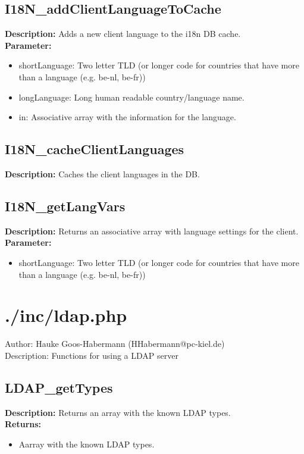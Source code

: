 \subsection{I18N\_addClientLanguageToCache}
\textbf{Description:} Adds a new client language to the i18n DB cache.\\
\textbf{Parameter:}
\begin{itemize}
\item shortLanguage: Two letter TLD (or longer code for countries that have more than a language (e.g. be-nl, be-fr))
\item longLanguage: Long human readable country/language name.
\item in: Associative array with the information for the language.
\end{itemize}

\subsection{I18N\_cacheClientLanguages}
\textbf{Description:} Caches the client languages in the DB.\\

\subsection{I18N\_getLangVars}
\textbf{Description:} Returns an associative array with language settings for the client.\\
\textbf{Parameter:}
\begin{itemize}
\item shortLanguage: Two letter TLD (or longer code for countries that have more than a language (e.g. be-nl, be-fr))
\end{itemize}

\newpage\section{./inc/ldap.php}
 Author: Hauke Goos-Habermann (HHabermann@pc-kiel.de)\\
 Description: Functions for using a LDAP server\\

\subsection{LDAP\_getTypes}
\textbf{Description:} Returns an array with the known LDAP types.\\
\textbf{Returns:}
\begin{itemize}
\item Aarray with the known LDAP types.
\end{itemize}

